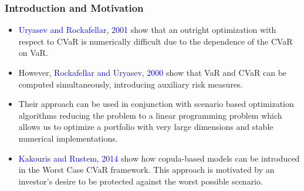 \documentclass[pdf,10pt,xcolor=dvipsnames,hide notes]{beamer}
\begin{document}
\begin{frame}[label=frame1b]
	\frametitle{Introduction and Motivation}
	
	\begin{itemize}
		\justifying
		
\vspace{0.3cm}

%

	\item \textcolor{blue}{Uryasev and Rockafellar}, \textcolor{blue}{2001} show that an outright optimization with respect to CVaR is numerically difficult due to the dependence of the
CVaR on VaR. 

\vspace{0.3cm}

	\item However, \textcolor{blue}{Rockafellar and Uryasev}, \textcolor{blue}{2000} show that VaR and CVaR can be	computed simultaneously, introducing auxiliary risk measures. 
	
	\vspace{0.3cm}
	
	\item Their approach can be
	used in conjunction with scenario based optimization algorithms reducing the
	problem to a linear programming problem which allows us to optimize a portfolio with very large dimensions and stable numerical implementations.
	
	\vspace{0.3cm}
	
	\item \textcolor{blue}{Kakouris and Rustem}, \textcolor{blue}{2014} show how copula-based models can be
	introduced in the Worst Case CVaR framework. This approach is
	motivated by an investor's desire to be protected against the worst possible
	scenario.

	
    \end{itemize}
	
\end{frame}
\end{document}
